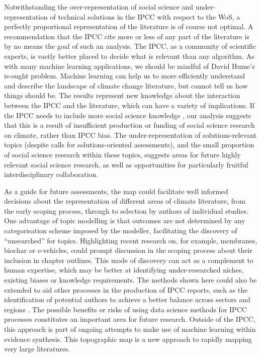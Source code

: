 \documentclass{article}
\begin{document}
\begin{linenumbers}
		

		Notwithstanding the over-representation of social science and under-representation of technical solutions in the IPCC with respect to the WoS, a
		 perfectly proportional representation of the literature is of course not optimal. A recommendation that the IPCC cite more or less of any part of the literature is by no means the goal of such an analysis. The IPCC, as a community of scientific experts, is vastly better placed to decide what is relevant than any algorithm. 
		As with many machine learning applications, we should be mindful of David Hume's is-ought problem. 
		Machine learning can help us to more efficiently understand and describe the landscape of climate change literature, but cannot tell us how things should be. 
		The results represent new knowledge about the interaction between the IPCC and the literature, which can have a variety of implications. 
		If the IPCC needs to include more social science knowledge \cite{Victor2015}, our analysis suggests that this is a result of insufficient production or funding of social science research on climate, rather than IPCC bias. 
		The under-representation of solutions-relevant topics (despite calls for solutions-oriented assessments), and the small proportion of social science research within these topics,  suggests areas for future highly relevant social science research, as well as opportunities for particularly fruitful interdisciplinary collaboration. 
		
		
		As a guide for future assessments, the map could facilitate well informed decisions about the representation of different areas of climate literature, from the early scoping process, through to selection by authors of individual studies.
		One advantage of topic modelling is that outcomes are not determined by any categorisation scheme imposed by the modeller, facilitating the discovery of ``unsearched'' for topics. 
		Highlighting recent research on, for example, membranes, biochar or e-vehicles, could prompt discussion in the scoping process about their inclusion in chapter outlines.
		This mode of discovery can act as a complement to human expertise, which may be better at identifying under-researched niches, existing biases or knowledge requirements.
		The methods shown here could also be extended to aid other processes in the production of IPCC reports, such as the identification of potential authors to achieve a better balance across sectors and regions \cite{Corbera2016}. The possible benefits or risks of using data science methods for IPCC processes constitutes an important area for future research.
		Outside of the IPCC, this approach is part of ongoing attempts to make use of machine learning within evidence synthesis. This topographic map is a new approach to rapidly mapping very large literatures. 
		

\end{linenumbers}
\end{document}
